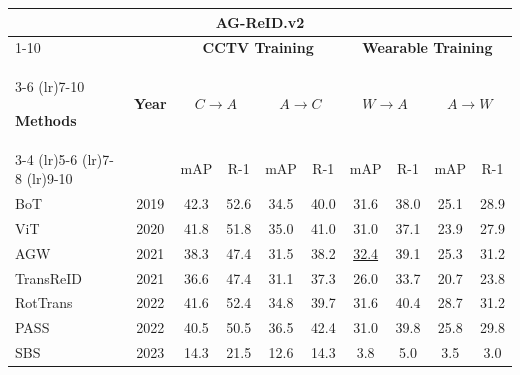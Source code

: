 \documentclass[border=4pt]{standalone}
\begin{document}
\scriptsize
\setlength{\tabcolsep}{6pt}
\begin{tabular}{l c cccc cccc}
            \toprule
            \multicolumn{10}{c}{\textbf{AG-ReID.v2}} \\

            \cmidrule(lr){1-10}

            &
            & \multicolumn{4}{c}{\textbf{CCTV Training}}
            & \multicolumn{4}{c}{\textbf{Wearable Training}} \\

            \cmidrule(lr){3-6} \cmidrule(lr){7-10}

            \textbf{Methods} & \textbf{Year}
            & \multicolumn{2}{c}{$C \rightarrow A$}
            & \multicolumn{2}{c}{$A \rightarrow C$}
            & \multicolumn{2}{c}{$W \rightarrow A$}
            & \multicolumn{2}{c}{$A \rightarrow W$} \\

            \cmidrule(lr){3-4} \cmidrule(lr){5-6} \cmidrule(lr){7-8} \cmidrule(lr){9-10}

            & & mAP & R-1 & mAP & R-1
            & mAP & R-1 & mAP & R-1 \\
            \midrule

            BoT & 2019
            & 42.3 & 52.6 & 34.5 & 40.0
            & 31.6 & 38.0 & 25.1 & 28.9 \\

            ViT & 2020
            & 41.8 & 51.8 & 35.0 & 41.0
            & 31.0 & 37.1 & 23.9 & 27.9 \\

            AGW & 2021
            & 38.3 & 47.4 & 31.5 & 38.2
            & \underline{32.4} & 39.1 & 25.3 & 31.2 \\

            TransReID & 2021
            & 36.6 & 47.4 & 31.1 & 37.3
            & 26.0 & 33.7 & 20.7 & 23.8 \\

            RotTrans & 2022
            & 41.6 & 52.4 & 34.8 & 39.7
            & 31.6 & 40.4 & 28.7 & 31.2 \\

            PASS & 2022
            & 40.5 & 50.5 & 36.5 & 42.4
            & 31.0 & 39.8 & 25.8 & 29.8 \\

            SBS & 2023
            & 14.3 & 21.5 & 12.6 & 14.3
            & 3.8 & 5.0 & 3.5 & 3.0 \\


\end{tabular}
\end{document}
